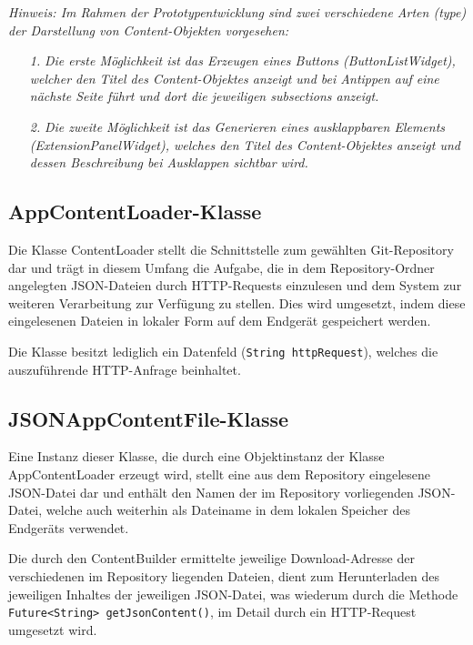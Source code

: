 \documentclass[bibliography=totoc,listof=totoc,BCOR=5mm,DIV=12,oneside]{scrbook}
\begin{document}
{\par \bigskip \textit{Hinweis: Im Rahmen der Prototypentwicklung sind zwei verschiedene Arten (type) der Darstellung von Content-Objekten vorgesehen:}
\begin{itemize}
\item[\textit{1.}] \textit{Die erste Möglichkeit ist das Erzeugen eines Buttons (\grqq ButtonListWidget\grqq), welcher den Titel des Content-Objektes anzeigt und bei Antippen auf eine nächste Seite führt und dort die jeweiligen subsections anzeigt.}
\item[\textit{2.}] \textit{Die zweite Möglichkeit ist das Generieren eines ausklappbaren Elements (\grqq ExtensionPanelWidget\grqq), welches den Titel des Content-Objektes anzeigt und dessen Beschreibung bei Ausklappen sichtbar wird.}
\end{itemize}

\newpage
\subsection{AppContentLoader-Klasse}
\par Die Klasse ContentLoader stellt die Schnittstelle zum gewählten Git-Repository dar und trägt in diesem Umfang die Aufgabe, die in dem Repository-Ordner angelegten JSON-Dateien durch HTTP-Requests  einzulesen und dem System zur weiteren Verarbeitung zur Verfügung zu stellen. Dies wird umgesetzt, indem diese eingelesenen Dateien in lokaler Form auf dem Endgerät gespeichert werden.
\par Die Klasse besitzt lediglich ein Datenfeld (\texttt{String httpRequest}), welches die auszuführende HTTP-Anfrage beinhaltet.

\subsection{JSONAppContentFile-Klasse}
\par Eine Instanz dieser Klasse, die durch eine Objektinstanz der Klasse AppContentLoader erzeugt wird, stellt eine aus dem Repository eingelesene JSON-Datei dar und enthält 
den Namen der im Repository vorliegenden JSON-Datei, welche auch weiterhin als Dateiname in dem lokalen Speicher des Endgeräts verwendet. 
\par Die durch den ContentBuilder ermittelte jeweilige Download-Adresse der verschiedenen im Repository liegenden Dateien, dient zum Herunterladen des jeweiligen Inhaltes der jeweiligen JSON-Datei, was wiederum durch die Methode \texttt{Future<String> getJsonContent()}, im Detail durch ein HTTP-Request umgesetzt wird.

}
\end{document}

